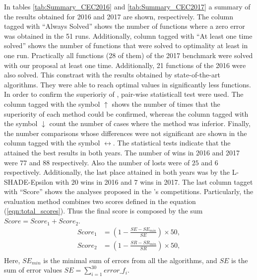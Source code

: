 In tables \ref{tab:Summary_CEC2016} and \ref{tab:Summary_CEC2017} a summary of the results obtained for \CEC{} 2016 and \CEC{} 2017 are shown, respectively.
%
The column tagged with ``Always Solved'' shows the number of functions where a zero error was obtained in the 51 runs.
%
Additionally, column tagged with ``At least one time solved'' shows the number of functions that were solved to optimality at least in one run.
%
Practically all functions (28 of them) of the \CEC{} 2017 benchmark were solved with our proposal at least one time.
%
Additionally, 21 functions of the \CEC{} 2016 were also solved.
%
This constrast with the results obtained by state-of-the-art algorithms.
%
They were able to reach optimal values in significantly less functions.
%
In order to confirm the superioriy of \DEEDM{}, pair-wise statisticall test were used.
%
The column tagged with the symbol $\uparrow$ shows the number of times that the superiority of each method could be confirmed, whereas
the column tagged with the symbol $\downarrow$ count the number of cases where the method was inferior.
%
Finally, the number comparisons whose differences were not significant are shown in the column tagged with the symbol $\longleftrightarrow$.
%
The statistical tests indicate that the \DEEDM{} attained the best results in both years.
%
The number of wins in \CEC{} 2016 and \CEC{} 2017 were $77$ and $88$ respectively.
%
Also the number of losts were of $25$ and $6$ respectively.
%
Additionally, the last place attained in both years was by the L-SHADE-Epsilon with $20$ wins in 2016 and $7$ wins in 2017.
%
%
The last column tagget with ``Score'' shows the analyses proposed in the \CEC{}'s competitions.
%
Particularly, the evaluation method combines two scores defined in the equation (\ref{eqn:total_scores}).
%
%
Thus the final score is composed by the sum $Score = Score_1 + Score_2$.
%
\begin{equation}\label{eqn:total_scores}
\begin{split}
Score_1 &= \left (1 - \frac{SE - SE_{min}}{SE} \right) \times 50, \\
Score_2 &= \left  (1 - \frac{SR - SR_{min}}{SR} \right ) \times 50, \\
\end{split}
\end{equation}
Here, $SE_{min}$ is the minimal sum of errors from all the algorithms, and $SE$ is the sum of error values $SE = \sum_{i=1}^{30} error\_f_i$.
